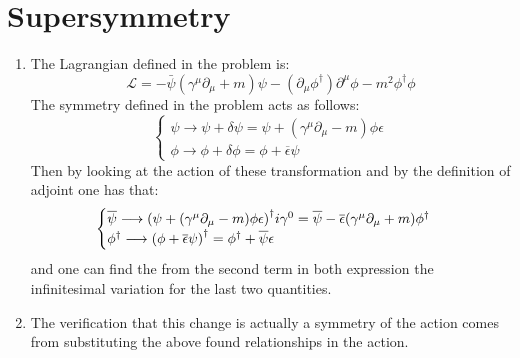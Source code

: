 \documentclass[11pt, oneside]{article}   	%
\begin{document}
\begin{enumerate}[label=\alph*)]
\end{enumerate}

\section{Supersymmetry}

\begin{enumerate}[label=\alph*)]

\item The Lagrangian defined in the problem is:
\[
	\mathcal{L}=-\bar{\psi}(\gamma^\mu\partial_\mu+m) \psi-\left(\partial_{\mu} \phi^{\dagger}\right) \partial^{\mu} \phi-m^{2} \phi^{\dagger} \phi
\]
The symmetry defined in the problem acts as follows:
\[
\begin{cases}
	\psi \longrightarrow \psi + \delta \psi = \psi + (\gamma^\mu \partial_\mu - m) \phi \epsilon \\
	\phi \longrightarrow \phi + \delta \phi = \phi + \overline{\epsilon} \psi
\end{cases}
\]
Then by looking at the action of these transformation and by the definition of adjoint one has that:
\[
\begin{cases}
	\overline{\psi} \longrightarrow \qty(\psi + (\gamma^\mu \partial_\mu - m) \phi \epsilon)^\dagger i\gamma^0 = \overline{\psi} - \overline{\epsilon} \qty( \gamma^\mu \partial_\mu + m) \phi^\dagger\\
	\phi^\dagger \longrightarrow \qty(\phi + \overline{\epsilon} \psi)^\dagger = \phi^\dagger + \overline{\psi}\epsilon
\end{cases}
\]
and one can find the from the second term in both expression the infinitesimal variation for the last two quantities.

\item The verification that this change is actually a symmetry of the action comes from substituting the above found relationships in the action.


\end{enumerate}
\end{document}
